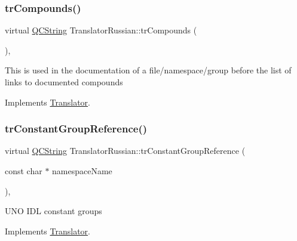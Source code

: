 \mbox{\label{class_translator_russian_a5582345f1c9799c76c099363364dd2b6}} 
\subsubsection{\texorpdfstring{trCompounds()}{trCompounds()}}
{\footnotesize\ttfamily virtual \mbox{\hyperlink{class_q_c_string}{Q\+C\+String}} Translator\+Russian\+::tr\+Compounds (\begin{DoxyParamCaption}{ }\end{DoxyParamCaption})\hspace{0.3cm}{\ttfamily [inline]}, {\ttfamily [virtual]}}

This is used in the documentation of a file/namespace/group before the list of links to documented compounds 

Implements \mbox{\hyperlink{class_translator}{Translator}}.

\mbox{\label{class_translator_russian_a1ff21bd28a1e84236b68ec5ef2d01fa9}} 
\subsubsection{\texorpdfstring{trConstantGroupReference()}{trConstantGroupReference()}}
{\footnotesize\ttfamily virtual \mbox{\hyperlink{class_q_c_string}{Q\+C\+String}} Translator\+Russian\+::tr\+Constant\+Group\+Reference (\begin{DoxyParamCaption}\item[{const char $\ast$}]{namespace\+Name }\end{DoxyParamCaption})\hspace{0.3cm}{\ttfamily [inline]}, {\ttfamily [virtual]}}

U\+NO I\+DL constant groups 

Implements \mbox{\hyperlink{class_translator}{Translator}}.

\mbox{\label{class_translator_russian_a13648c6a079a22503e9698b8d4fc005f}} 
